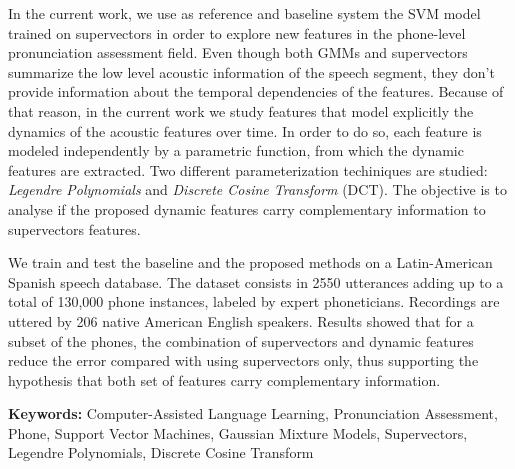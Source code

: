 In the current work, we use as reference and baseline system the SVM model
trained on supervectors in order to explore new features in the
phone-level pronunciation assessment field.
Even though both GMMs and supervectors
summarize the low level acoustic information of the speech segment,
they don't provide information about the temporal dependencies of the features.
Because of that reason, in the current work we study
features that model explicitly the dynamics of the
acoustic features over time. In order to do so, each feature is modeled independently
by a parametric function, from which the dynamic features are extracted.
Two different parameterization techiniques are studied:
\textit{Legendre Polynomials} and \textit{Discrete Cosine Transform} (DCT).
The objective is to analyse if the proposed dynamic features carry
complementary information to supervectors features.

We train and test the baseline and the proposed methods on a
Latin-American Spanish speech database.
The dataset consists in 2550 utterances adding up to a total of
130,000 phone instances, labeled
by expert phoneticians. Recordings are uttered by 206 native American English speakers.
Results showed that for a subset of the phones, the combination of supervectors and
dynamic features reduce the error compared with using supervectors only, thus supporting
the hypothesis that both set of features carry complementary information.

\bigskip

\noindent\textbf{Keywords:} Computer-Assisted Language Learning, Pronunciation Assessment, Phone, Support Vector Machines, Gaussian Mixture Models, Supervectors, Legendre Polynomials, Discrete Cosine Transform
